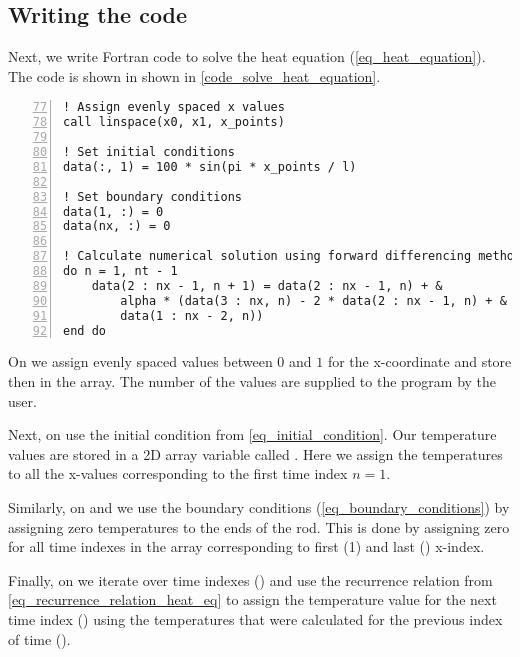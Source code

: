 \subsection{Writing the code}

Next, we write Fortran code to solve the heat equation (\autoref{eq_heat_equation}). The code is shown in shown in \autoref{code_solve_heat_equation}.


\noindent\begin{minipage}{\linewidth}
\begin{lstlisting}[caption={Solving a heat equation with forward-difference method (\code{heat\_equation.f90}).},frame=tlrb,label={code_solve_heat_equation}, numbers=left, firstnumber=77]
! Assign evenly spaced x values
call linspace(x0, x1, x_points)

! Set initial conditions
data(:, 1) = 100 * sin(pi * x_points / l)

! Set boundary conditions
data(1, :) = 0
data(nx, :) = 0

! Calculate numerical solution using forward differencing method
do n = 1, nt - 1
    data(2 : nx - 1, n + 1) = data(2 : nx - 1, n) + &
        alpha * (data(3 : nx, n) - 2 * data(2 : nx - 1, n) + &
        data(1 : nx - 2, n))
end do
\end{lstlisting}
\end{minipage}

On  we assign evenly spaced values between $0$ and $1$ for the x-coordinate and store then in the  array. The number of the values  are supplied to the program by the user.

Next, on  use the initial condition from \autoref{eq_initial_condition}. Our temperature values are stored in a 2D array variable called . Here we assign the temperatures to all the x-values corresponding to the first time index $n=1$.

Similarly, on  and  we use the boundary conditions (\autoref{eq_boundary_conditions}) by assigning zero temperatures to the ends of the rod. This is done by assigning zero for all time indexes in the  array corresponding to first (1) and last () x-index.

Finally, on  we iterate over time indexes () and use the recurrence relation from \autoref{eq_recurrence_relation_heat_eq} to assign the temperature value for the next time index () using the temperatures that were calculated for the previous index of time ().

